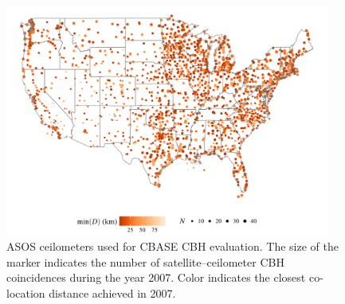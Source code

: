 \documentclass[essd,manuscript]{copernicus}\usepackage[]{graphicx}\usepackage[]{color}
\newenvironment{knitrout}{}{} %
\begin{document}

\begin{figure}
  \centering
\begin{knitrout}
\color{fgcolor}

{\centering \includegraphics[width=0.95\textwidth]{figure/method-eval-asos-1} 

}



\end{knitrout}
  \caption{ASOS ceilometers used for CBASE CBH evaluation.  The size of the
    marker indicates the number of satellite--ceilometer CBH coincidences during
    the year 2007.  Color indicates the closest co-location distance achieved in
    2007.}
  \label{fig:asos}
\end{figure}
\end{document}
